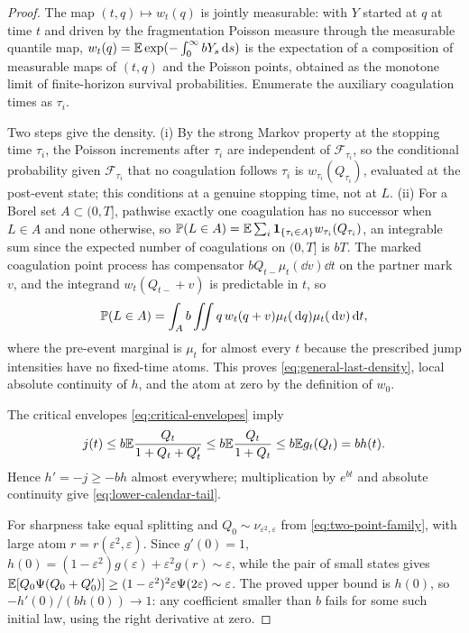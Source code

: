 \begin{proof}
The map $(t,q)\mapsto w_t(q)$ is jointly measurable: with $Y$ started
at $q$ at time $t$ and driven by the fragmentation Poisson measure
through the measurable quantile map,
$w_t(q)=\mathbb E\exp(-\int_0^\infty bY_s\,\mathrm d s)$ is the expectation of a
composition of measurable maps of $(t,q)$ and the Poisson points,
obtained as the monotone limit of finite-horizon survival
probabilities. Enumerate the auxiliary coagulation times as $\tau_i$.

Two steps give the density. (i) By the strong Markov property at the
stopping time $\tau_i$, the Poisson increments after $\tau_i$ are
independent of $\mathcal F_{\tau_i}$, so the conditional probability
given $\mathcal F_{\tau_i}$ that no coagulation follows $\tau_i$ is
$w_{\tau_i}(Q_{\tau_i})$, evaluated at the post-event state; this
conditions at a genuine stopping time, not at $L$. (ii) For a Borel
set $A\subset(0,T]$, pathwise exactly one coagulation has no successor
when $L\in A$ and none otherwise, so
$\mathbb P(L\in A)=\mathbb E\sum_i\mathbf 1_{\{\tau_i\in A\}}w_{\tau_i}(Q_{\tau_i})$,
an integrable sum since the expected number of coagulations on
$(0,T]$ is $bT$. The marked coagulation point process has compensator
$bQ_{t-}\mu_t(\dd v)\dd t$ on the partner mark $v$, and the integrand
$w_t(Q_{t-}+v)$ is predictable in $t$, so
\[
 \mathbb P(L\in A)
 =\int_A b\iint q\,w_t(q+v)\mu_t(\,\mathrm d q)\mu_t(\,\mathrm d v)\,\mathrm d t,
\]
where the pre-event marginal is $\mu_t$ for almost every $t$ because
the prescribed jump intensities have no fixed-time atoms. This proves
\eqref{eq:general-last-density}, local absolute continuity of $h$, and
the atom at zero by the definition of $w_0$.

The critical envelopes \eqref{eq:critical-envelopes} imply
\[
 j(t)\leq b\mathbb E\frac{Q_t}{1+Q_t+Q'_t}
      \leq b\mathbb E\frac{Q_t}{1+Q_t}\leq b\mathbb E g_t(Q_t)=bh(t).
\]
Hence $h'=-j\geq-bh$ almost everywhere; multiplication by $e^{bt}$ and
absolute continuity give \eqref{eq:lower-calendar-tail}.

For sharpness take equal splitting and
$Q_0\sim\nu_{\varepsilon^2,\varepsilon}$ from
\eqref{eq:two-point-family}, with large atom
$r=r(\varepsilon^2,\varepsilon)$. Since $g'(0)=1$,
$h(0)=(1-\varepsilon^2)g(\varepsilon)+\varepsilon^2g(r)\sim\varepsilon$,
while the pair of small states gives
$\mathbb E[Q_0\Psi(Q_0+Q'_0)]\geq(1-\varepsilon^2)^2\varepsilon\Psi(2\varepsilon)
\sim\varepsilon$. The proved upper bound is $h(0)$, so
$-h'(0)/(bh(0))\to1$: any coefficient smaller than $b$ fails for some
such initial law, using the right derivative at zero.
\end{proof}

